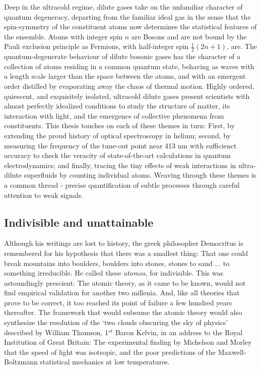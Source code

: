 	Deep in the ultracold regime, dilute gases take on the unfamiliar character of quantum degeneracy, departing from the familiar ideal gas in the sense that the spin-symmetry of the constituent atoms now determines the statistical features of the ensemble. Atoms with integer spin $n$ are Bosons and are not bound by the Pauli exclusion principle as Fermions, with half-integer spin $\frac{1}{2}(2n+1)$, are. The quantum-degenerate behaviour of dilute bosonic gases has the character of a collection of atoms residing in a common quantum state, behaving as waves with a length scale larger than the space between the atoms, and with an emergent order distilled by evaporating away the chaos of thermal motion. Highly ordered, quiescent, and exquisitely isolated, ultracold dilute gases present scientists with almost perfectly idealized conditions to study the structure of matter, its interaction with light, and the emergence of collective phenomena from constituents. This thesis touches on each of these themes in turn: First, by extending the proud history of optical spectroscopy in helium; second, by measuring the frequency of the tune-out point near 413 nm with sufficienct accuracy to check the veracity of state-of-the-art calculations in quantum electrodynamics; and finally, tracing the tiny effects of weak interactions in ultra-dilute superfluids by counting individual atoms. Weaving through these themes is a common thread - precise quantification of subtle processes through careful attention to weak signals.

\subsection*{Indivisible and unattainable}

	Although his writings are lost to history, the greek philosopher Democritus is remembered for his hypothesis that there was a smallest thing: That one could break mountains into boulders, boulders into stones, stones to sand ... to something irreducible. He called these \emph{atomos}, for indivisible.	This was astoundingly prescient: The atomic theory, as it came to be known, would not find empirical validation for another two millenia. And, like all theories that prove to be correct, it too reached its point of failure a few hundred years thereafter. 	The framework that would subsume the atomic theory would also synthesize the resolution of the `two clouds obscuring the sky of physics' described by William Thomson, 1$^{st}$ Baron Kelvin, in an address to the Royal Institution of Great Britain: The experimental finding by Michelson and Morley that the speed of light was isotropic, and the poor predictions of the Maxwell-Boltzmann statistical mechanics at low temperatures.

